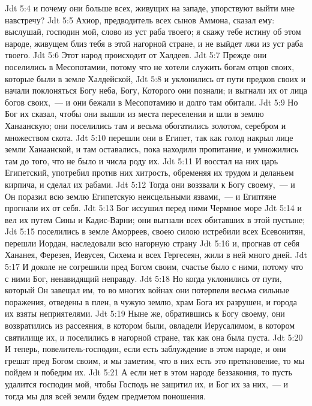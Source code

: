 \vs Jdt 5:4 и почему они больше всех, живущих на западе, упорствуют выйти мне навстречу?
\vs Jdt 5:5 Ахиор, предводитель всех сынов Аммона, сказал ему: выслушай, господин мой, слово из уст раба твоего; я скажу тебе истину об этом народе, живущем близ тебя в этой нагорной стране, и не выйдет лжи из уст раба твоего.
\vs Jdt 5:6 Этот народ происходит от Халдеев.
\vs Jdt 5:7 Прежде они поселились в Месопотамии, потому что не хотели служить богам отцов своих, которые были в земле Халдейской,
\vs Jdt 5:8 и уклонились от пути предков своих и начали поклоняться Богу неба, Богу, Которого они познали; и  выгнали их от лица богов своих,~--- и они бежали в Месопотамию и долго там обитали.
\vs Jdt 5:9 Но Бог их сказал, чтобы они вышли из места переселения и шли в землю Ханаанскую; они поселились там и весьма обогатились золотом, серебром и множеством скота.
\vs Jdt 5:10  перешли они в Египет, так как голод накрыл лице земли Ханаанской, и там оставались, пока находили пропитание, и умножились там до того, что не было и числа роду их.
\vs Jdt 5:11 И восстал на них царь Египетский, употребил против них хитрость, обременяя их трудом и деланьем кирпича, и сделал их рабами.
\vs Jdt 5:12 Тогда они воззвали к Богу своему,~--- и Он поразил всю землю Египетскую неисцельными язвами,~--- и Египтяне прогнали их от себя.
\vs Jdt 5:13 Бог иссушил перед ними Чермное море
\vs Jdt 5:14 и вел их путем Сины и Кадис-Варни; они выгнали всех обитавших в этой пустыне;
\vs Jdt 5:15 поселились в земле Аморреев, своею силою истребили всех Есевонитян, перешли Иордан, наследовали всю нагорную страну
\vs Jdt 5:16 и, прогнав от себя Хананея, Ферезея, Иевусея, Сихема и всех Гергесеян, жили в ней много дней.
\vs Jdt 5:17 И доколе не согрешили пред Богом своим, счастье было с ними, потому что с ними Бог, ненавидящий неправду.
\vs Jdt 5:18 Но когда уклонились от пути, который Он завещал им, то во многих войнах они потерпели весьма сильные поражения, отведены в плен, в чужую землю, храм Бога их разрушен, и города их взяты неприятелями.
\vs Jdt 5:19 Ныне же, обратившись к Богу своему, они возвратились из рассеяния, в котором были, овладели Иерусалимом, в котором святилище их, и поселились в нагорной стране, так как она была пуста.
\vs Jdt 5:20 И теперь, повелитель-господин, если есть заблуждение в этом народе, и они грешат пред Богом своим, и мы заметим, что в них есть это преткновение, то мы пойдем и победим их.
\vs Jdt 5:21 А если нет в этом народе беззакония, то пусть удалится господин мой, чтобы Господь не защитил их, и Бог их  за них,~--- и тогда мы для всей земли будем предметом поношения.

